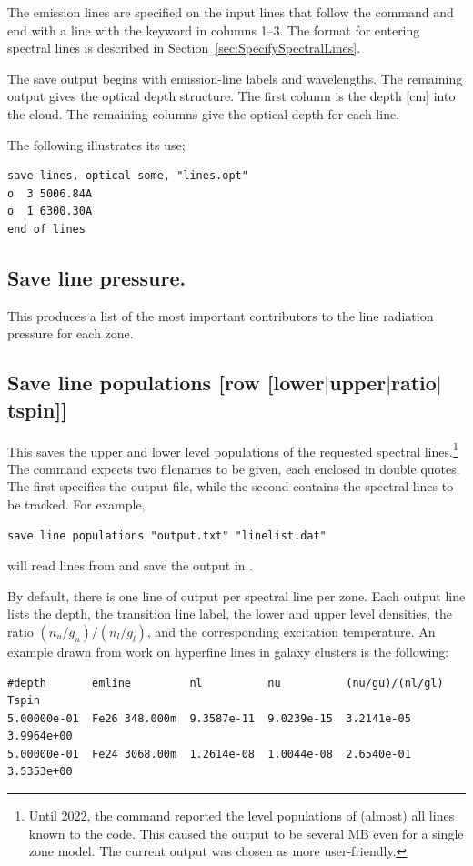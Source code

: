 The emission lines are specified on the input lines that follow the
command and end with a line with the keyword  in columns 1--3.
The format for entering spectral lines is described in Section~\ref{sec:SpecifySpectralLines}.

The save output begins with emission-line labels and wavelengths.  The
remaining output gives the optical depth structure.  The first column is the
depth [cm] into the cloud.  The remaining columns give the optical depth for each line.  

The following illustrates its use;
\begin{verbatim}
save lines, optical some, "lines.opt"
o  3 5006.84A
o  1 6300.30A
end of lines
\end{verbatim}

\subsection{Save line pressure.}

This produces a list of the most important contributors to the line
radiation pressure for each zone.

\subsection{Save line populations
        [row [lower$\vert$upper$\vert$ratio$\vert$tspin]]}
\label{sec:CommandSaveHyperfinePops}

This saves the upper and lower level populations of the requested spectral
lines.\footnote{
Until 2022, the command reported the level populations of (almost) all lines
known to the code.
This caused the output to be several MB even for a single zone model.
The current output was chosen as more user-friendly.
}
The command expects two filenames to be given, each enclosed in double quotes.
The first specifies the output file, while the second contains the spectral
lines to be tracked.
For example,
%
\begin{verbatim}
save line populations "output.txt" "linelist.dat"
\end{verbatim}
%
will read lines from  and save the output in
.

By default, there is one line of output per spectral line per zone.
Each output line lists the depth, the transition line label,
the lower and upper level densities, the ratio $(n_u/g_u)/(n_l/g_l)$,
and the corresponding excitation temperature.
An example drawn from work on hyperfine lines in galaxy clusters is the
following:
%
\begin{verbatim}
#depth       emline         nl          nu          (nu/gu)/(nl/gl)  Tspin
5.00000e-01  Fe26 348.000m  9.3587e-11  9.0239e-15  3.2141e-05       3.9964e+00
5.00000e-01  Fe24 3068.00m  1.2614e-08  1.0044e-08  2.6540e-01       3.5353e+00
\end{verbatim}

